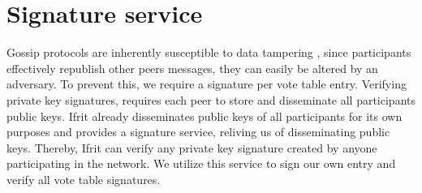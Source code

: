 \documentclass[USenglish]{uit-thesis}
\begin{document}
\section{Signature service}
Gossip protocols are inherently susceptible to data tampering \cite{gossip_promise}, since participants effectively republish other peers messages, they can easily be altered by an adversary.
To prevent this, we require a signature per vote table entry.
Verifying private key signatures, requires each peer to store and disseminate all participants public keys.
Ifrit already disseminates public keys of all participants for its own purposes and provides a signature service, reliving us of disseminating public keys.
Thereby, Ifrit can verify any private key signature created by anyone participating in the network.
We utilize this service to sign our own entry and verify all vote table signatures.
\fi










\end{document}
